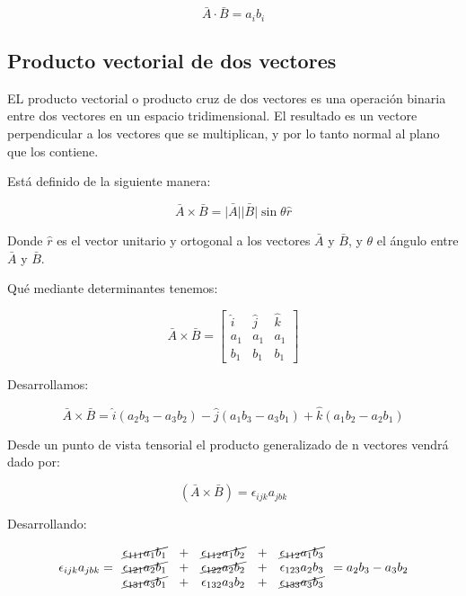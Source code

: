 \documentclass{article}
\providecommand{\abs}[1]{\lvert#1\rvert}
\begin{document}
\begin{equation}
    \bar{A} \cdot \bar{B} = a_i b_i
\end{equation}

\subsection{Producto vectorial de dos vectores}

EL producto vectorial o producto cruz de dos vectores es una operación binaria
entre dos vectores en un espacio tridimensional. El resultado es un vectore
perpendicular a los vectores que se multiplican, y por lo tanto normal al plano
que los contiene.

Está definido de la siguiente manera:

\begin{equation}
    \bar{A} \times \bar{B}= \bar{\abs{A}} \bar{\abs{B}} \sin \theta \hat{r}
\end{equation}

Donde $\hat{r}$ es el vector unitario y ortogonal a los vectores $\bar{A}$ y
$\bar{B}$, y $\theta$ el ángulo entre $\bar{A}$ y
$\bar{B}$.

Qué mediante determinantes tenemos:

\begin{equation}
    \bar{A} \times \bar{B}=
    \begin{bmatrix}
        \hat{i} & \hat{j} & \hat{k}\\ 
         a_1 & a_1 & a_1\\ 
         b_1 & b_1 & b_1
    \end{bmatrix}
\end{equation}

Desarrollamos:

\begin{equation}
    \bar{A} \times \bar{B}= \hat{i}(a_2 b_3 - a_3 b_2) - \hat{j}(a_1 b_3 - a_3 b_1) + \hat{k}(a_1 b_2 - a_2 b_1)
\end{equation}

Desde un punto de vista tensorial el producto generalizado de n vectores vendrá
dado por:

\begin{equation}
    (\bar{A} \times \bar{B}) = \epsilon_{ijk} a_{jbk}
\end{equation}

Desarrollando:

\begin{equation}
    \epsilon_{ijk} a_{jbk} =
    \begin{array}{ccccc}
        \cancel{\epsilon_{111} a_1 b_1} & + & \cancel{\epsilon_{112} a_1 b_2}   & + & \cancel{\epsilon_{112} a_1 b_3}   \\
        \cancel{\epsilon_{121} a_2 b_1} & + & \cancel{\epsilon_{122} a_2 b_2}   & + & \epsilon_{123} a_2 b_3            \\
        \cancel{\epsilon_{131} a_3 b_1} & + & \epsilon_{132} a_3 b_2            & + & \cancel{\epsilon_{133} a_3 b_3}
    \end{array}
    = a_2 b_3 - a_3 b_2
\end{equation}
\end{document}
